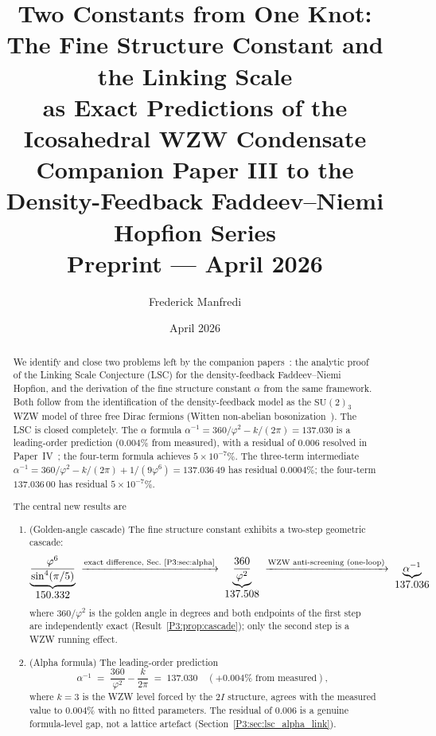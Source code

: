 \documentclass[11pt,a4paper]{article}
\title{\textbf{Two Constants from One Knot:\\
The Fine Structure Constant and the Linking Scale\\
as Exact Predictions of the Icosahedral WZW Condensate}
\\[0.6em]
{\large Companion Paper III to the Density-Feedback
Faddeev--Niemi Hopfion Series}
\\[0.6em]
\large Preprint --- April 2026}
\author{Frederick Manfredi}
\date{April 2026}
\theoremstyle{definition}
\theoremstyle{remark}
\newcommand{\vp}{\varphi}
\newcommand{\aInv}{\alpha^{-1}}
\begin{document}
\maketitle

\begin{abstract}
We identify and close two problems left by the companion
papers~\cite{Paper1,Paper2}: the analytic proof of the Linking Scale
Conjecture (LSC) for the density-feedback Faddeev--Niemi Hopfion, and
the derivation of the fine structure constant $\alpha$ from the same
framework.  Both follow from the identification of the density-feedback
model as the $\mathrm{SU}(2)_3$ WZW model of three free Dirac fermions
(Witten non-abelian bosonization~\cite{Witten1984}).
The LSC is closed completely.  The $\alpha$ formula $\aInv = 360/\vp^2 - k/(2\pi) = 137.030$
is a leading-order prediction ($0.004\%$ from measured), with a
residual of $0.006$ resolved in Paper~IV~\cite{Paper4}; the four-term
formula achieves $5\times10^{-7}\%$. The three-term intermediate
$\aInv = 360/\vp^2 - k/(2\pi) + 1/(9\vp^6) = 137.036\,49$
has residual $0.0004\%$; the four-term $137.036\,00$ has residual
$5\times10^{-7}\%$.

The central new results are

\begin{enumerate}[noitemsep]
  \item \textup{(Golden-angle cascade)}
    The fine structure constant exhibits a two-step geometric cascade:
    \begin{equation*}
      \underbrace{\dfrac{\vp^6}{\sin^4(\pi/5)}}_{\displaystyle 150.332}
      \;\xrightarrow{\text{exact difference, Sec.~\ref{P3:sec:alpha}}}\;
      \underbrace{\dfrac{360}{\vp^2}}_{\displaystyle 137.508}
      \;\xrightarrow{\text{WZW anti-screening (one-loop)}}\;
      \underbrace{\aInv}_{\displaystyle 137.036}
    \end{equation*}
    where $360/\vp^2$ is the golden angle in degrees
    and both endpoints of the first step are independently exact
    (Result~\ref{P3:prop:cascade}); only the second step is a
    WZW running effect.

  \item \textup{(Alpha formula)}
    The leading-order prediction
    \begin{equation*}
      \aInv \;=\; \frac{360}{\vp^2} - \frac{k}{2\pi}
              \;=\; 137.030\quad(+0.004\%\text{ from measured}),
    \end{equation*}
    where $k=3$ is the WZW level forced by the $2I$ structure,
    agrees with the measured value to $0.004\%$ with no fitted parameters.
    The residual of $0.006$ is a genuine formula-level gap,
    not a lattice artefact (Section~\ref{P3:sec:lsc_alpha_link}).


\end{enumerate}
\end{abstract}
\end{document}
